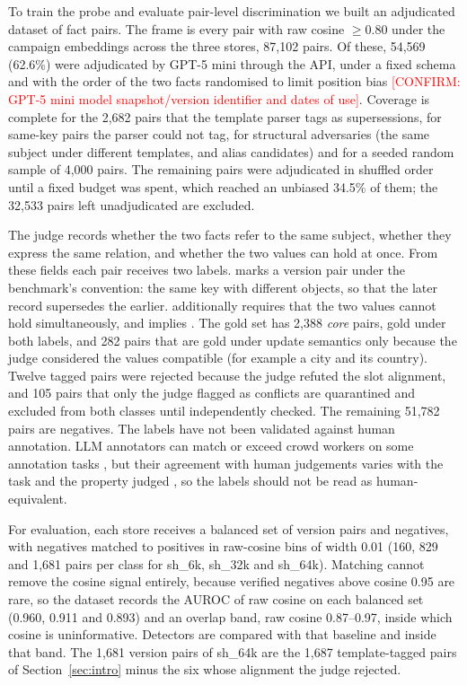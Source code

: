 \documentclass{CUP-JNL-NLP}
\newcommand{\code}[1]{\texttt{\detokenize{#1}}}          %
\newcommand{\sub}[1]{\textsf{sh\_#1}}                    %
\newcommand{\confirm}[1]{\textcolor{red}{[CONFIRM: #1]}} %
\begin{document}
To train the probe and evaluate pair-level discrimination we built an adjudicated dataset of fact pairs. The frame is every pair with raw cosine $\ge0.80$ under the campaign embeddings across the three stores, 87,102 pairs. Of these, 54,569 (62.6\%) were adjudicated by GPT-5 mini through the API, under a fixed schema and with the order of the two facts randomised to limit position bias \citep{zheng2023judging,wang2024fair} \confirm{GPT-5 mini model snapshot/version identifier and dates of use}.
Coverage is complete for the 2,682 pairs that the template parser tags as supersessions, for same-key pairs the parser could not tag, for structural adversaries (the same subject under different templates, and alias candidates) and for a seeded random sample of 4,000 pairs. The remaining pairs were adjudicated in shuffled order until a fixed budget was spent, which reached an unbiased 34.5\% of them; the 32,533 pairs left unadjudicated are excluded.

The judge records whether the two facts refer to the same subject, whether they express the same relation, and whether the two values can hold at once. From these fields each pair receives two labels. \code{gold_update} marks a version pair under the benchmark's convention: the same key with different objects, so that the later record supersedes the earlier. \code{gold_strict} additionally requires that the two values cannot hold simultaneously, and implies \code{gold_update}. The gold set has 2,388 \emph{core} pairs, gold under both labels, and 282 pairs that are gold under update semantics only because the judge considered the values compatible (for example a city and its country). Twelve tagged pairs were rejected because the judge refuted the slot alignment, and 105 pairs that only the judge flagged as conflicts are quarantined and excluded from both classes until independently checked. The remaining 51,782 pairs are negatives. The labels have not been validated against human annotation. LLM annotators can match or exceed crowd workers on some annotation tasks \citep{gilardi2023chatgpt}, but their agreement with human judgements varies with the task and the property judged \citep{bavaresco2025llms}, so the labels should not be read as human-equivalent.

For evaluation, each store receives a balanced set of version pairs and negatives, with negatives matched to positives in raw-cosine bins of width 0.01 (160, 829 and 1,681 pairs per class for \sub{6k}, \sub{32k} and \sub{64k}). Matching cannot remove the cosine signal entirely, because verified negatives above cosine 0.95 are rare, so the dataset records the AUROC of raw cosine on each balanced set (0.960, 0.911 and 0.893) and an overlap band, raw cosine 0.87--0.97, inside which cosine is uninformative. Detectors are compared with that baseline and inside that band. The 1,681 version pairs of \sub{64k} are the 1,687 template-tagged pairs of Section~\ref{sec:intro} minus the six whose alignment the judge rejected.
\end{document}
